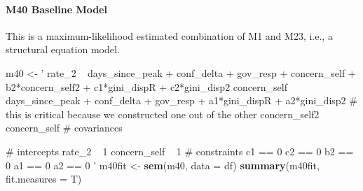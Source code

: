 \documentclass[
]{article}
\newenvironment{Shaded}{\begin{snugshade}}{\end{snugshade}}
\newcommand{\DataTypeTok}[1]{\textcolor[rgb]{0.13,0.29,0.53}{#1}}
\newcommand{\KeywordTok}[1]{\textcolor[rgb]{0.13,0.29,0.53}{\textbf{#1}}}
\newcommand{\NormalTok}[1]{#1}
\newcommand{\StringTok}[1]{\textcolor[rgb]{0.31,0.60,0.02}{#1}}
\begin{document}
\hypertarget{m40-baseline-model}{%
\paragraph{M40 Baseline Model}\label{m40-baseline-model}}

This is a maximum-likelihood estimated combination of M1 and M23, i.e.,
a structural equation model.

\begin{Shaded}
\begin{Highlighting}[]
\NormalTok{m40 <-}\StringTok{ '     rate_2 ~ days_since_peak + conf_delta + gov_resp + concern_self + b2*concern_self2  + c1*gini_dispR + c2*gini_disp2}
\StringTok{             concern_self ~ days_since_peak + conf_delta + gov_resp + a1*gini_dispR + a2*gini_disp2}
\StringTok{           # this is critical because we constructed one out of the other   }
\StringTok{             concern_self2 ~ concern_self}
\StringTok{           # covariances}

\StringTok{           # intercepts}
\StringTok{             rate_2 ~ 1}
\StringTok{             concern_self ~ 1}
\StringTok{           # constraints}
\StringTok{             c1 == 0}
\StringTok{             c2 == 0}
\StringTok{             b2 == 0}
\StringTok{             a1 == 0}
\StringTok{             a2 == 0}
\StringTok{         '}
\NormalTok{m40fit <-}\StringTok{ }\KeywordTok{sem}\NormalTok{(m40, }\DataTypeTok{data =}\NormalTok{ df)}
\KeywordTok{summary}\NormalTok{(m40fit, }\DataTypeTok{fit.measures =}\NormalTok{ T)}
\end{Highlighting}
\end{Shaded}
\end{document}
